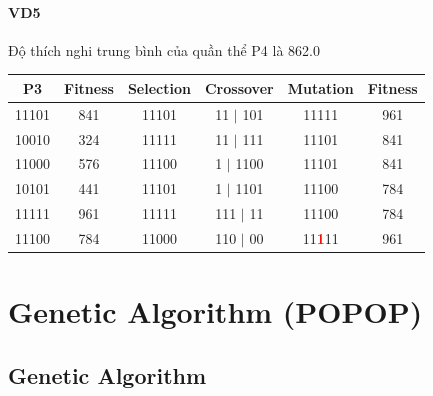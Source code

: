 \documentclass{book}
\begin{document}
\subsubsection{VD5} Độ thích nghi trung bình của quần thể P4 là 862.0
\begin{table}[H]
    \centering
    \begin{tabular}{|c|c|c|c|c|c|}
    \hline
    \textbf{P3} & \textbf{Fitness} & \textbf{Selection} & \textbf{Crossover} & \textbf{Mutation} & \textbf{Fitness} \\
    \hline
    11101 & 841 & 11101 & 11 $|$ 101 & 11111 & 961 \\
    10010 & 324 & 11111 & 11 $|$ 111 & 11101 & 841 \\
    11000 & 576 & 11100 & 1 $|$ 1100 & 11101 & 841 \\
    10101 & 441 & 11101 & 1 $|$ 1101 & 11100 & 784 \\
    11111 & 961 & 11111 & 111 $|$ 11 & 11100 & 784 \\
    11100 & 784 & 11000 & 110 $|$    00 & 11\textcolor{red}{\textbf{1}}11 & 961 \\ %
    \hline
    \end{tabular}
\end{table}
\chapter{Genetic Algorithm (POPOP)}
\section{Genetic Algorithm}
\end{document}
